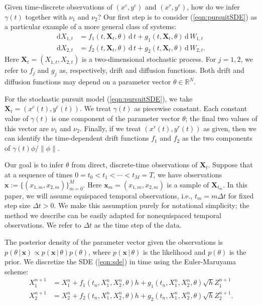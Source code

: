 \documentclass[graybox]{svmult}
\begin{document}
Given time-discrete observations of
$(x^{c},y^{c})$ and $(x^{r},y^{r})$, how do we infer $\gamma(t)$
together with $\nu_1$ and $\nu_2$?  Our first step is to consider
(\ref{eqn:pursuitSDE}) as a particular example of a more general class of systems:
\begin{subequations}
\label{eqn:sde}
\begin{align}
\mathrm{d}X_{1,t} &= f_1(t, \mathbf{X}_t, \theta) \, \mathrm{d} \, t + g_1(t, \mathbf{X}_t, \theta) \, \mathrm{d} \, W_{1,t} \\
\mathrm{d}X_{2,t} &= f_2(t, \mathbf{X}_t, \theta)\, \mathrm{d} \, t + g_2(t, \mathbf{X}_t, \theta) \, \mathrm{d} \, W_{2,t}.
\end{align}
\end{subequations}
Here $\mathbf{X}_t = (X_{1,t}, X_{2,t})$ is a two-dimensional
stochastic process. For $j=1, 2$, we refer to $f_j$ and $g_j$ as,
respectively, drift and diffusion functions.  Both
drift and diffusion functions may depend on a parameter vector
$\theta \in \mathbb{R}^{N}$.

For the stochastic pursuit model (\ref{eqn:pursuitSDE}), we take
$\mathbf{X}_t = (x^{c}(t), y^{c}(t))$.  We treat $\gamma(t)$ as
piecewise constant.  Each constant value of $\gamma(t)$ is one
component of the parameter vector $\theta$; the final two
values of this vector are $\nu_1$ and $\nu_2$.  Finally, if we treat
$(x^{r}(t), y^{r}(t))$ as given, then we can identify the time-dependent drift
functions $f_1$ and $f_2$ as the two components of $ \gamma(t) \phi /
\| \phi \|$. 

Our goal is to infer $\theta$ from direct, discrete-time observations of $\mathbf{X}_t$.  Suppose that at a sequence of times $0 = t_0 < t_1 < \cdots < t_M = T$, we have observations $\mathbf{x} := \{({x}_{1,m},{x}_{2,m})\}_{m=0}^M$.  Here $\mathbf{x}_m = ({x}_{1,m},{x}_{2,m})$ is a sample of $\mathbf{X}_{t_m}$.  In this paper, we will assume equispaced temporal observations, i.e., $t_m = m \Delta t$ for fixed step size $\Delta t > 0$.  We make this assumption purely for notational simplicity; the method we describe can be easily adapted for nonequispaced temporal observations.  We refer to $\Delta t$ as the time step of the data.

The posterior density of the parameter vector given the observations is
$p(\theta \, | \, \mathbf{x})  \propto p( \mathbf{x} \, | \, \theta)  p(\theta)$,
where $p( \mathbf{x} \, | \, \theta)$ is the likelihood and $p(\theta)$ is the prior.  We discretize the SDE (\ref{eqn:sde}) in time using the Euler-Maruyama scheme:
\begin{subequations}
\label{eqn:discretesde}
\begin{align}
X_1^{n+1} &= X_1^{n} + f_1(t_n, X_1^n, X_2^n, \theta)h + g_1(t_n, X_1^n, X_2^n,  \theta) \sqrt{h} Z_1^{n+1} \\
X_2^{n+1} &= X_2^{n} + f_2(t_n, X_1^n, X_2^n,\theta)h + g_2(t_n, X_1^n, X_2^n,\theta) \sqrt{h} Z_2^{n+1}.
\end{align}
\end{subequations}
\end{document}

